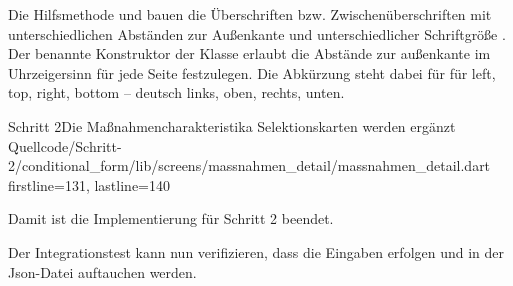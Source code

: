 Die Hilfsmethode  und  bauen die Überschriften  bzw. Zwischenüberschriften  mit unterschiedlichen Abständen zur Außenkante  und unterschiedlicher Schriftgröße . Der benannte Konstruktor  der Klasse  erlaubt die Abstände zur außenkante im Uhrzeigersinn für jede Seite festzulegen. Die Abkürzung  steht dabei für für left, top, right, bottom -- deutsch links, oben, rechts, unten.

\begin{alexlisting}{Schritt 2}{Die Maßnahmencharakteristika Selektionskarten werden ergänzt}
  {Quellcode/Schritt-2/conditional_form/lib/screens/massnahmen_detail/massnahmen_detail.dart}
  {firstline=131, lastline=140}
  \label{lst:Schritt2buildSectionHeadlineBuildSubSectionHeadline}
\end{alexlisting}

Damit ist die Implementierung für Schritt 2 beendet.

Der Integrationstest kann nun verifizieren, dass die Eingaben erfolgen und in der Json-Datei auftauchen werden.






\clearpage 
